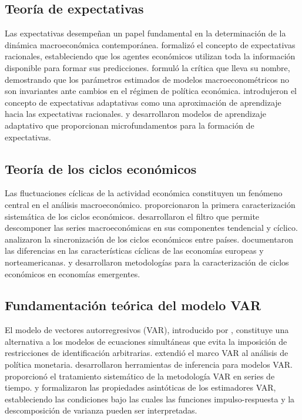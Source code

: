 \documentclass[12pt,a4paper]{article}
\begin{document}
\subsection{Teoría de expectativas}

Las expectativas desempeñan un papel fundamental en la determinación de la dinámica macroeconómica contemporánea. \citet{muth1961} formalizó el concepto de expectativas racionales, estableciendo que los agentes económicos utilizan toda la información disponible para formar sus predicciones. \citet{lucas1976} formuló la crítica que lleva su nombre, demostrando que los parámetros estimados de modelos macroeconométricos no son invariantes ante cambios en el régimen de política económica. \citet{evans1992} introdujeron el concepto de expectativas adaptativas como una aproximación de aprendizaje hacia las expectativas racionales. \citet{sargent1993} y \citet{honkapohja2009} desarrollaron modelos de aprendizaje adaptativo que proporcionan microfundamentos para la formación de expectativas.

\subsection{Teoría de los ciclos económicos}

Las fluctuaciones cíclicas de la actividad económica constituyen un fenómeno central en el análisis macroeconómico. \citet{burns1946} proporcionaron la primera caracterización sistemática de los ciclos económicos. \citet{hodrick1997} desarrollaron el filtro que permite descomponer las series macroeconómicas en sus componentes tendencial y cíclico. \citet{stock1999} analizaron la sincronización de los ciclos económicos entre países. \citet{agresti2004} documentaron las diferencias en las características cíclicas de las economías europeas y norteamericanas. \citet{canova2020} y \citet{pagan2021} desarrollaron metodologías para la caracterización de ciclos económicos en economías emergentes.

\subsection{Fundamentación teórica del modelo VAR}

El modelo de vectores autorregresivos (VAR), introducido por \citet{sims1980}, constituye una alternativa a los modelos de ecuaciones simultáneas que evita la imposición de restricciones de identificación arbitrarias. \citet{sims1982} extendió el marco VAR al análisis de política monetaria. \citet{doan1984} desarrollaron herramientas de inferencia para modelos VAR. \citet{hamilton1994} proporcionó el tratamiento sistemático de la metodología VAR en series de tiempo. \citet{lutkepohl2005} y \citet{littlepohl2015} formalizaron las propiedades asintóticas de los estimadores VAR, estableciendo las condiciones bajo las cuales las funciones impulso-respuesta y la descomposición de varianza pueden ser interpretadas.
\end{document}
